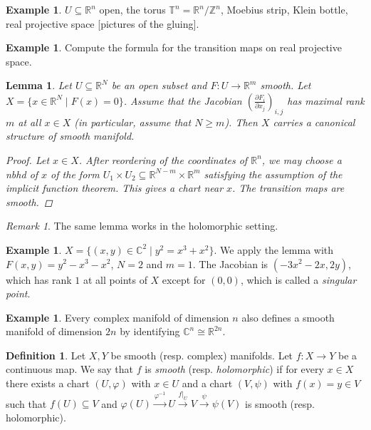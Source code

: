 \documentclass[11pt,A4]{article}
\theoremstyle{plain}
\newtheorem{lm}[thm]{Lemma}
\theoremstyle{definition}
\newtheorem{defn}[thm]{Definition}
\newtheorem{exa}[thm]{Example}
\theoremstyle{remark}
\newtheorem{rem}[thm]{Remark}
\newcommand{\Z}{\mathbb{Z}}
\newcommand{\R}{\mathbb{R}}
\newcommand{\1}{\mathbbm{1}}
\newcommand{\C}{\mathbb{C}}
\newcommand{\tms}{\times}
\newcommand{\sub}{\subseteq}
\begin{document}
\begin{exa}
    $U\sub \R^{n}$ open, the torus $\mathbb{T}^{n}=\R^{n}/\Z^{n}$, Moebius strip, Klein bottle, real projective space [pictures of the gluing].
\end{exa}

\begin{exa}
    Compute the formula for the transition maps on real projective space.
\end{exa}

\begin{lm}
    Let $U\sub \R^{N}$ be an open subset and $F\colon U\to \R^{m}$ smooth.
    Let $X=\{ x\in \R^{N}\mid F(x)=0\}$.
    Assume that the Jacobian $(\frac{\partial F_{i}}{\partial x_{j}})_{i,j}$ has maximal rank $m$ at all $x\in X$ (in particular, assume that $N\geqslant m$).
    Then $X$ carries a canonical structure of smooth manifold.
    \begin{proof}
	Let $x\in X$.
	After reordering of the coordinates of $\R^{n}$, we may choose a nbhd of $x$ of the form $U_{1}\tms U_{2}\sub \R^{N-m}\tms \R^{m}$ satisfying the assumption of the implicit function theorem.
	This gives a chart near $x$.
	The transition maps are smooth.
    \end{proof}
\end{lm}

\begin{rem}
    The same lemma works in the holomorphic setting.
\end{rem}

\begin{exa}
    $X=\{(x,y)\in \C^{2}\mid y^{2}=x^{3}+x^{2} \}$.
    We apply the lemma with $F(x,y)=y^{2}-x^{3}-x^{2}$, $N=2$ and $m=1$.
    The Jacobian is $(-3x^{2}-2x,2y)$, which has rank $1$ at all points of $X$ except for $(0,0)$, which is called a \textit{singular point}.
\end{exa}

\begin{exa}
    Every complex manifold of dimension $n$ also defines a smooth manifold of dimension $2n$ by identifying $\C^{n}\cong \R^{2n}$.
\end{exa}

\begin{defn}
    Let $X,Y$ be smooth (resp. complex) manifolds.
    Let $f\colon X\to Y$ be a continuous map.
    We say that $f$ is \textit{smooth} (resp. \textit{holomorphic}) if for every $x\in X$ there exists a chart $(U,\varphi)$ with $x\in U$ and a chart $(V,\psi)$ with $f(x)=y\in V$ such that $f(U)\sub V$ and $\varphi(U)\xrightarrow{\varphi^{-1}}U\xrightarrow{f|_{U}} V\xrightarrow{\psi} \psi(V)$ is smooth (resp. holomorphic).
\end{defn}
\end{document}
